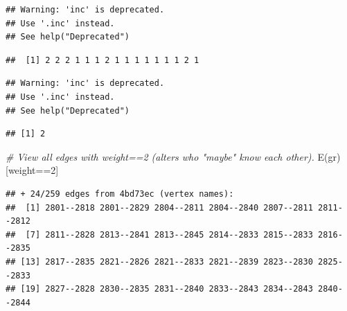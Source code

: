 \documentclass[
]{book}
\newenvironment{Shaded}{\begin{snugshade}}{\end{snugshade}}
\newcommand{\CommentTok}[1]{\textcolor[rgb]{0.56,0.35,0.01}{\textit{#1}}}
\newcommand{\DecValTok}[1]{\textcolor[rgb]{0.00,0.00,0.81}{#1}}
\newcommand{\FunctionTok}[1]{\textcolor[rgb]{0.00,0.00,0.00}{#1}}
\newcommand{\NormalTok}[1]{#1}
\newcommand{\SpecialCharTok}[1]{\textcolor[rgb]{0.00,0.00,0.00}{#1}}
\newcommand{\StringTok}[1]{\textcolor[rgb]{0.31,0.60,0.02}{#1}}
\begin{document}
\begin{Shaded}
\end{Shaded}

\begin{verbatim}
## Warning: 'inc' is deprecated.
## Use '.inc' instead.
## See help("Deprecated")
\end{verbatim}

\begin{verbatim}
##  [1] 2 2 2 1 1 1 2 1 1 1 1 1 1 1 2 1
\end{verbatim}

\begin{Shaded}
\end{Shaded}

\begin{verbatim}
## Warning: 'inc' is deprecated.
## Use '.inc' instead.
## See help("Deprecated")
\end{verbatim}

\begin{verbatim}
## [1] 2
\end{verbatim}

\begin{Shaded}
\begin{Highlighting}[]
\CommentTok{\# View all edges with weight==2 (alters who "maybe" know each other).}
\FunctionTok{E}\NormalTok{(gr)[weight}\SpecialCharTok{==}\DecValTok{2}\NormalTok{] }
\end{Highlighting}
\end{Shaded}

\begin{verbatim}
## + 24/259 edges from 4bd73ec (vertex names):
##  [1] 2801--2818 2801--2829 2804--2811 2804--2840 2807--2811 2811--2812
##  [7] 2811--2828 2813--2841 2813--2845 2814--2833 2815--2833 2816--2835
## [13] 2817--2835 2821--2826 2821--2833 2821--2839 2823--2830 2825--2833
## [19] 2827--2828 2830--2835 2831--2840 2833--2843 2834--2843 2840--2844
\end{verbatim}
\end{document}
